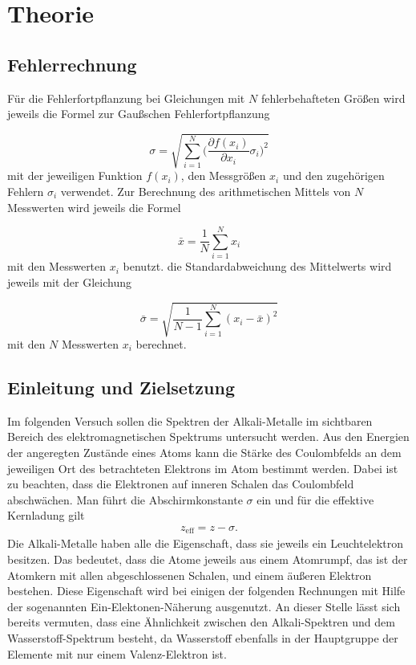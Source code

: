 \section{Theorie}
\label{sec:Theorie}

\subsection{Fehlerrechnung}

Für die Fehlerfortpflanzung bei Gleichungen mit $N$ fehlerbehafteten Größen
wird jeweils die Formel zur Gaußschen Fehlerfortpflanzung

\begin{equation}
  \sigma = \sqrt{\sum_{i=1}^{N}\biggl(\frac{\partial f(x_i)}{\partial x_i}
  \sigma_i\biggr)^2}
\end{equation}
mit der jeweiligen Funktion $f(x_i)$, den Messgrößen $x_i$ und den
zugehörigen Fehlern $\sigma_i$ verwendet.
Zur Berechnung des arithmetischen Mittels von $N$ Messwerten wird jeweils die
Formel

\begin{equation}
  \bar{x} = \frac{1}{N}\sum_{i=1}^{N}x_i
\end{equation}
mit den Messwerten $x_i$ benutzt.
die Standardabweichung des Mittelwerts wird jeweils mit der Gleichung

\begin{equation}
  \bar{\sigma} = \sqrt{\frac{1}{N-1}\sum_{i=1}^{N}(x_i - \bar{x})^2}
\end{equation}
mit den $N$ Messwerten $x_i$ berechnet.

\subsection{Einleitung und Zielsetzung}

Im folgenden Versuch sollen die Spektren der Alkali-Metalle im sichtbaren
Bereich des elektromagnetischen Spektrums untersucht werden. Aus den
Energien der angeregten Zustände eines Atoms kann die Stärke des
Coulombfelds an dem jeweiligen Ort des betrachteten Elektrons im Atom
bestimmt werden. Dabei ist
zu beachten, dass die Elektronen auf inneren Schalen das Coulombfeld abschwächen.
Man führt die Abschirmkonstante $\sigma$ ein und für die
effektive Kernladung gilt
\begin{align}
  z_\text{eff} = z - \sigma.
\end{align}
Die Alkali-Metalle haben alle die Eigenschaft, dass sie jeweils ein
Leuchtelektron besitzen. Das bedeutet, dass
die Atome jeweils aus einem Atomrumpf, das ist der Atomkern mit allen
abgeschlossenen Schalen, und einem äußeren Elektron bestehen. Diese
Eigenschaft wird bei einigen der folgenden Rechnungen mit Hilfe der sogenannten
Ein-Elektonen-Näherung ausgenutzt. An dieser Stelle lässt sich
bereits vermuten, dass eine Ähnlichkeit zwischen den Alkali-Spektren und dem
Wasserstoff-Spektrum besteht, da Wasserstoff ebenfalls in der Hauptgruppe der
Elemente mit nur einem Valenz-Elektron ist.

